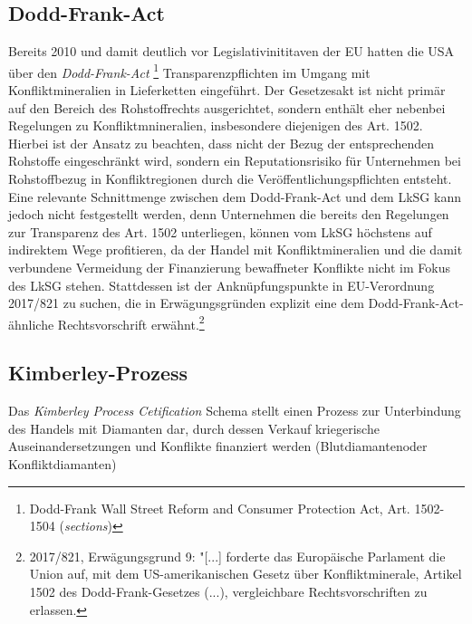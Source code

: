 \documentclass[12pt,a4paper,oneside]{book} %
\begin{document}
	\subsection{Dodd-Frank-Act}
	Bereits 2010 und damit deutlich vor Legislativinititaven der EU hatten die USA über den \textit{Dodd-Frank-Act} \footnote{Dodd-Frank Wall Street Reform and Consumer Protection Act, Art. 1502-1504 (\textit{sections})} Transparenzpflichten im Umgang mit Konfliktmineralien in Lieferketten eingeführt. Der Gesetzesakt ist nicht primär auf den Bereich des Rohstoffrechts ausgerichtet, sondern enthält eher nebenbei Regelungen zu Konfliktmnineralien, insbesondere diejenigen des Art. 1502.  Hierbei ist der Ansatz zu beachten, dass nicht der Bezug der entsprechenden Rohstoffe eingeschränkt wird, sondern ein Reputationsrisiko für Unternehmen bei Rohstoffbezug in Konfliktregionen durch die Veröffentlichungspflichten entsteht.\autocite[Rn. 415]{ruttloff_lieferkettensorgfaltspflichtengesetz_2022} Eine relevante Schnittmenge zwischen dem Dodd-Frank-Act und dem LkSG kann jedoch nicht festgestellt werden, denn Unternehmen die bereits den Regelungen zur Transparenz des Art. 1502 unterliegen, können vom LkSG höchstens auf indirektem Wege profitieren, da der Handel mit Konfliktmineralien und die damit verbundene Vermeidung der Finanzierung bewaffneter Konflikte nicht im Fokus des LkSG stehen.\autocite[Rn 423]{ruttloff_lieferkettensorgfaltspflichtengesetz_2022} Stattdessen ist der Anknüpfungspunkte in EU-Verordnung 2017/821 zu suchen, die in Erwägungsgründen explizit eine dem Dodd-Frank-Act-ähnliche Rechtsvorschrift erwähnt.\footnote{2017/821, Erwägungsgrund 9: "[...] forderte das Europäische Parlament die Union auf, mit dem US-amerikanischen Gesetz über Konfliktminerale, Artikel 1502 des Dodd-Frank-Gesetzes (...), vergleichbare Rechtsvorschriften zu erlassen.} 
		
	\subsection{Kimberley-Prozess}
	Das \textit{Kimberley Process Cetification} Schema stellt einen Prozess zur Unterbindung des Handels mit Diamanten dar, durch dessen Verkauf kriegerische Auseinandersetzungen und Konflikte finanziert werden (\glqq Blutdiamanten\grqq oder Konfliktdiamanten)
	
\end{document}
